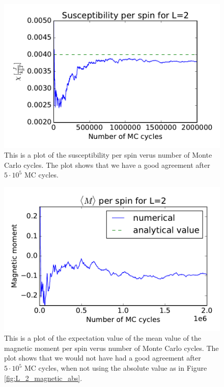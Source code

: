 \begin{figure}[H]
\includegraphics[width=\linewidth]{../results/4b/L_2_susceptibility}\caption{This is a plot of the susceptibility per spin verus number of Monte Carlo cycles. The plot shows that we have a good agreement after $ 5 \cdot 10^{5} $ MC cycles.}\label{fig:L_2_susceptibility}
\end{figure}

\begin{figure}[H]
\includegraphics[width=\linewidth]{../results/4b/L_2_magnetic}\caption{This is a plot of the expectation value of the mean value of the magnetic moment per spin verus number of Monte Carlo cycles. The plot shows that we would not have had a good agreement after $ 5 \cdot 10^{5} $ MC cycles, when not using the absolute value as in Figure \ref{fig:L_2_magnetic_abs}.}\label{fig:L_2_magnetic}
\end{figure}


